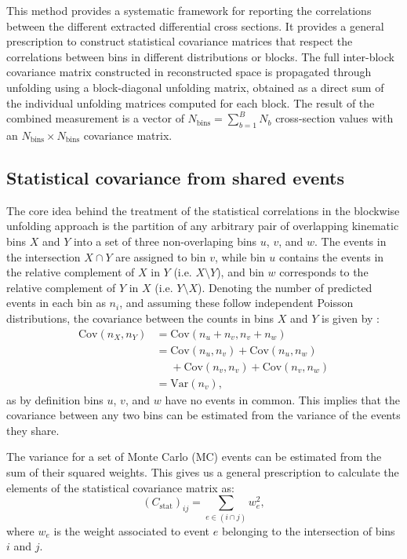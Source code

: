 \documentclass[aps,prd,twocolumn,showpacs,superscriptaddress,floatfix]{revtex4-2}
\begin{document}
This method provides a systematic framework for reporting the correlations between the different extracted differential cross sections. It provides a general prescription to construct statistical covariance matrices that respect the correlations between bins in different distributions or blocks. The full inter-block covariance matrix constructed in reconstructed space is propagated through unfolding using a block-diagonal unfolding matrix, obtained as a direct sum of the individual unfolding matrices computed for each block. The result of the combined measurement is a vector of $N_{\text{bins}} = \sum_{b=1}^{B} N_b$ cross-section values with an $N_{\text{bins}} \times N_{\text{bins}}$ covariance matrix.

\subsection{Statistical covariance from shared events}

The core idea behind the treatment of the statistical correlations in the blockwise unfolding approach is the partition of any arbitrary pair of overlapping kinematic bins $X$ and $Y$ into a set of three non-overlaping bins $u$, $v$, and $w$. The events in the intersection $X \cap Y$ are assigned to bin $v$, while bin $u$ contains the events in the relative complement of $X$ in $Y$ (i.e. $X \setminus Y$), and bin $w$ corresponds to the relative complement of $Y$ in $X$ (i.e. $Y \setminus X$). Denoting the number of predicted events in each bin as $n_{i}$, and assuming these follow independent Poisson distributions, the covariance between the counts in bins $X$ and $Y$ is given by \cite{Gardiner:2024gdy}:
\begin{equation}
    \begin{split}
        \text{Cov}(n_{X}, n_{Y}) &= \text{Cov}(n_{u} + n_{v}, n_{v} + n_{w})\\
        &= \text{Cov}(n_{u}, n_{v}) + \text{Cov}(n_{u}, n_{w})\\
        &\phantom{=} + \text{Cov}(n_{v}, n_{v}) + \text{Cov}(n_{v}, n_{w})\\
        &= \text{Var}(n_{v}),
    \end{split}
\end{equation}
as by definition bins $u$, $v$, and $w$ have no events in common. This implies that the covariance between any two bins can be estimated from the variance of the events they share.

The variance for a set of Monte Carlo (MC) events can be estimated from the sum of their squared weights. This gives us a general prescription to calculate the elements of the statistical covariance matrix as:
\begin{equation}
    (C_{\text{stat}})_{ij} = \sum_{e \in (i \cap j)} w_{e}^{2},
\end{equation}
where $w_{e}$ is the weight associated to event $e$ belonging to the intersection of bins $i$ and $j$.
\end{document}
